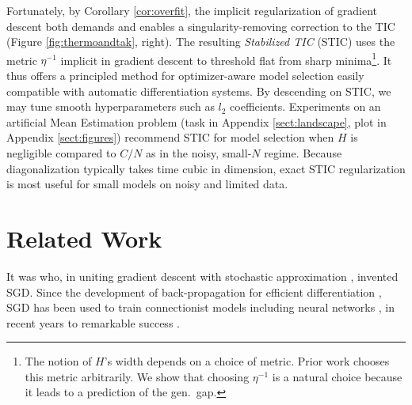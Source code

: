 \documentclass{article}
\theoremstyle{plain}
\theoremstyle{definition}
\begin{document}
        Fortunately, by Corollary \ref{cor:overfit}, the implicit
        regularization of gradient descent both demands and enables a
        singularity-removing correction to the TIC (Figure
        \ref{fig:thermoandtak}, right).  
        The resulting \emph{Stabilized TIC} (STIC) uses the metric $\eta^{-1}$
        implicit in gradient descent to threshold flat from sharp
        minima\footnote{
            The notion of $H$'s width depends on a choice of
            metric.  Prior work chooses this metric arbitrarily.  We show that
            choosing $\eta^{-1}$ is a natural choice because it leads to a
            prediction of the gen.\ gap.
        }.
        It thus offers a principled method for
        optimizer-aware model selection easily compatible with automatic
        differentiation systems.  By descending on STIC, we may tune smooth
        hyperparameters such as $l_2$ coefficients.  Experiments on an
        artificial Mean Estimation problem (task in Appendix
        \ref{sect:landscape}, plot in Appendix \ref{sect:figures}) recommend
        STIC for model selection when $H$ is negligible compared to $C/N$ as in
        the noisy, small-$N$ regime.  Because diagonalization typically takes
        time cubic in dimension, exact STIC regularization is most useful for
        small models on noisy and limited data.


\section{Related Work} \label{sect:related}


    It was \citet{ki52} who, in uniting gradient descent \citep{ca47} with
    stochastic approximation \citep{ro51}, invented SGD.  Since the development
    of back-propagation for efficient differentiation \citep{we74}, SGD has
    been used to train connectionist models including neural networks
    \citep{bo91}, in recent years to remarkable success \citep{le15}.

\end{document}
